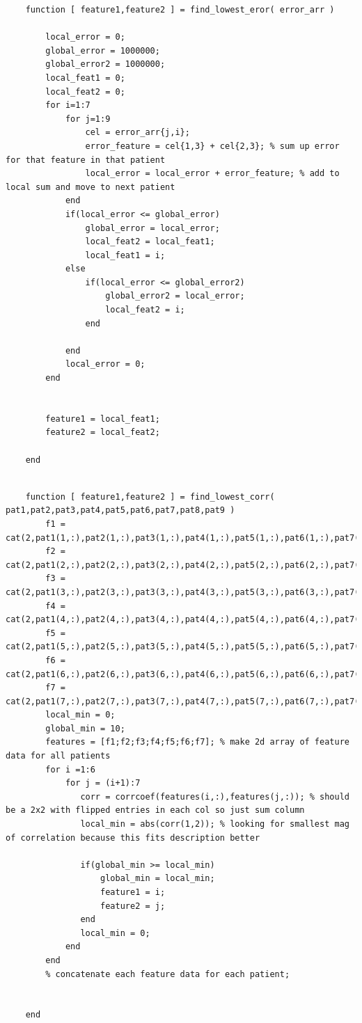 \documentclass{article}
\begin{document}
  \begin{lstlisting}
    function [ feature1,feature2 ] = find_lowest_eror( error_arr )

        local_error = 0;
        global_error = 1000000;
        global_error2 = 1000000;
        local_feat1 = 0;
        local_feat2 = 0;
        for i=1:7
            for j=1:9
                cel = error_arr{j,i};
                error_feature = cel{1,3} + cel{2,3}; % sum up error for that feature in that patient
                local_error = local_error + error_feature; % add to local sum and move to next patient
            end
            if(local_error <= global_error)
                global_error = local_error;
                local_feat2 = local_feat1;
                local_feat1 = i;
            else
                if(local_error <= global_error2)
                    global_error2 = local_error;
                    local_feat2 = i;
                end

            end
            local_error = 0;
        end


        feature1 = local_feat1;
        feature2 = local_feat2;

    end


    \end{lstlisting}
  \begin{lstlisting}
    function [ feature1,feature2 ] = find_lowest_corr( pat1,pat2,pat3,pat4,pat5,pat6,pat7,pat8,pat9 )
        f1 =  cat(2,pat1(1,:),pat2(1,:),pat3(1,:),pat4(1,:),pat5(1,:),pat6(1,:),pat7(1,:),pat8(1,:),pat9(1,:));
        f2 =  cat(2,pat1(2,:),pat2(2,:),pat3(2,:),pat4(2,:),pat5(2,:),pat6(2,:),pat7(2,:),pat8(2,:),pat9(2,:));
        f3 =  cat(2,pat1(3,:),pat2(3,:),pat3(3,:),pat4(3,:),pat5(3,:),pat6(3,:),pat7(3,:),pat8(3,:),pat9(3,:));
        f4 =  cat(2,pat1(4,:),pat2(4,:),pat3(4,:),pat4(4,:),pat5(4,:),pat6(4,:),pat7(4,:),pat8(4,:),pat9(4,:));
        f5 =  cat(2,pat1(5,:),pat2(5,:),pat3(5,:),pat4(5,:),pat5(5,:),pat6(5,:),pat7(5,:),pat8(5,:),pat9(5,:));
        f6 =  cat(2,pat1(6,:),pat2(6,:),pat3(6,:),pat4(6,:),pat5(6,:),pat6(6,:),pat7(6,:),pat8(6,:),pat9(6,:));
        f7 =  cat(2,pat1(7,:),pat2(7,:),pat3(7,:),pat4(7,:),pat5(7,:),pat6(7,:),pat7(7,:),pat8(7,:),pat9(7,:));
        local_min = 0;
        global_min = 10;
        features = [f1;f2;f3;f4;f5;f6;f7]; % make 2d array of feature data for all patients
        for i =1:6
            for j = (i+1):7
               corr = corrcoef(features(i,:),features(j,:)); % should be a 2x2 with flipped entries in each col so just sum column
               local_min = abs(corr(1,2)); % looking for smallest mag of correlation because this fits description better

               if(global_min >= local_min)
                   global_min = local_min;
                   feature1 = i;
                   feature2 = j;
               end
               local_min = 0;
            end
        end
        % concatenate each feature data for each patient;


    end
    \end{lstlisting}
\end{document}
